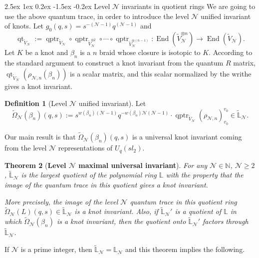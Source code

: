 \documentclass[reqno,a4paper,11pt]{amsart}
\makeatletter
\numberwithin{equation}{section}
\numberwithin{figure}{section}
\theoremstyle{definition}
\newtheorem{defn}{Definition}[section]
\theoremstyle{plain}
\newtheorem{thm}[defn]{Theorem}
\renewcommand*{\subsection}{\@startsection{subsection}{2}{\z@}%
	{2.5ex \@plus 1ex \@minus 0.2ex}%
	{-1.5ex \@plus -0.2ex}%
	{\normalfont\normalsize\bfseries}}
\newcommand{\N}{\mathbb N}
\newcommand{\qptr}{\operatorname{qptr}}
\newcommand{\qt}{\operatorname{qt}}
\newcommand{\Li}{{\mathbb L}}
\newcommand{\Liq}{\mathbb L}
\newcommand{\cN}{\mathcal{N}}
\renewcommand{\geq}{\geqslant}
\makeatother
\begin{document}
\subsection{Level $\cN$ invariants in quotient rings} 
%
We are going to use the above quantum trace, in order to introduce the level $\cN$ unified invariant of knots.  
Let 
${g_0}(q, s) = s^{-(\cN-1)}q^{(\cN-1)}$ and
\[
\qt_{\widetilde{V}_{\cN}}:=\qptr_{\widetilde{V}_{\cN}} \circ \qptr_{\widetilde{V}_{\cN}^{\otimes 2}} \circ \cdots \circ \qptr_{\widetilde{V}_{\cN}^{\otimes(n-1)}} : \operatorname{End}(\widetilde{V}_{\cN}^{\otimes n})\rightarrow \operatorname{End}(\widetilde{V}_{\cN}).
\]
%
Let $K$ be a knot and $\beta_n$ is a $n$ braid whose closure is isotopic to $K$.  
According to the  standard argument to construct a knot invariant from the quantum $R$ matrix, $\qt_{\widetilde{V}_{\cN}}(\rho_{\cN, n}(\beta_n))$   is a scalar matrix, and this scalar normalized by the writhe gives a knot invariant.  
%
\begin{defn}[Level $\cN$ unified invariant]
Let
\begin{equation}
\widetilde\Omega_{\cN}(\beta_n)(q,s)
:= 
s^{w(\beta_n)(\cN-1)}q^{-w(\beta_n){\cN(\cN-1)}} \cdot 
\qptr_{\widetilde{V}_{\cN}}\left( \rho_{\cN,n}
\right)_{v_0}^{v_0} \in \widetilde{\Li}_{\cN}.
\end{equation}
%
\end{defn}
%
%
Our main result is that $\widetilde\Omega_{\cN}(\beta_n)(q,s)$ is a universal knot invariant coming from the level $\cN$ representations of $U_q(sl_2)$.  
\begin{thm}[{\bf Level $\cN$ maximal universal invariant}]\label{thm:THEOREM}
%
For any $\cN \in \N$, $\cN \geq 2$, $\widetilde{\Li}_{\cN}$ is the largest quotient of the polynomial ring $\Liq$ with the property that the image of the quantum trace in this quotient gives a knot invariant. 
\par
More precisely, the image of the level $\cN$ quantum trace in this quotient ring $\widetilde{\Omega}_{\cN}(L)(q,s) \in \widetilde{\Li}_{\cN}$ is a knot invariant. 
Also, if $\widetilde{\Li}_{\cN}'$ is a quotient of $ \Li$ in which $\widetilde{\Omega}_{\cN}(\beta_n)$ is a knot invariant, then the quotient onto $\widetilde{\Li}_{\cN}'$ factors through $\widetilde{\Li}_{\cN}$.
\end{thm}

If $\cN$ is a prime integer, then $\widetilde{\Li}_{\cN} = \Li_{\cN}$ and this theorem implies the following.  
\end{document}
